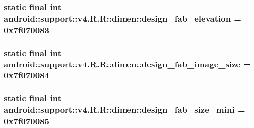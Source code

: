 \hypertarget{classandroid_1_1support_1_1v4_1_1_r_1_1dimen_4d481fc3e14b173eb7c2c0a946a7d314}{
\subsubsection[{design\_\-fab\_\-elevation}]{\setlength{\rightskip}{0pt plus 5cm}static final int android::support::v4.R.R::dimen::design\_\-fab\_\-elevation = 0x7f070083}}
\label{classandroid_1_1support_1_1v4_1_1_r_1_1dimen_4d481fc3e14b173eb7c2c0a946a7d314}


\hypertarget{classandroid_1_1support_1_1v4_1_1_r_1_1dimen_aea2a5f4c088480fc2992016a2de2861}{
\subsubsection[{design\_\-fab\_\-image\_\-size}]{\setlength{\rightskip}{0pt plus 5cm}static final int android::support::v4.R.R::dimen::design\_\-fab\_\-image\_\-size = 0x7f070084}}
\label{classandroid_1_1support_1_1v4_1_1_r_1_1dimen_aea2a5f4c088480fc2992016a2de2861}


\hypertarget{classandroid_1_1support_1_1v4_1_1_r_1_1dimen_2059748c1a805dab77f756eddf600b92}{
\subsubsection[{design\_\-fab\_\-size\_\-mini}]{\setlength{\rightskip}{0pt plus 5cm}static final int android::support::v4.R.R::dimen::design\_\-fab\_\-size\_\-mini = 0x7f070085}}
\label{classandroid_1_1support_1_1v4_1_1_r_1_1dimen_2059748c1a805dab77f756eddf600b92}


